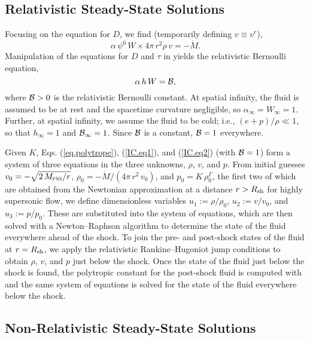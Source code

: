 \subsection{Relativistic Steady-State Solutions}

Focusing on the equation for $D$, we find
(temporarily defining $v\equiv v^{r}$),
\begin{equation}
  \alpha\,\psi^{6}\,W \times 4\pi\,r^{2}\rho\,v=-\dot{M}.
  \label{IC.eq1}
\end{equation}
Manipulation of the equations for $D$ and $\tau$
in  yields the relativistic Bernoulli equation,
\begin{equation}
  \alpha\,h\,W=\mathcal{B},
  \label{IC.eq2}
\end{equation}
where $\mathcal{B}>0$ is the relativistic Bernoulli constant.
At spatial infinity, the fluid is assumed to be at rest and the spacetime
curvature negligible, so $\alpha_{\infty}=W_{\infty}=1$.
Further, at spatial infinity, we assume the fluid to be cold; i.e.,
$\left(e+p\right)/\rho\ll1$,
so that $h_{\infty}=1$ and $\mathcal{B}_{\infty}=1$.
Since $\mathcal{B}$ is a constant, $\mathcal{B}=1$ everywhere.

Given $K$, Eqs. (\ref{eq.polytrope}), (\ref{IC.eq1}),
and (\ref{IC.eq2}) (with $\mathcal{B}=1$)
form a system of three equations in the three unknowns,
$\rho$, $v$, and $p$.
From initial guesses $v_{0}=-\sqrt{2\,M_{\textsc{pns}}/r}$,
$\rho_{0}=-\dot{M}/\left(4\pi\,r^{2}\,v_{0}\right)$, and
$p_{0}=K\,\rho_{0}^{\Gamma}$, the first two of which are obtained
from the Newtonian approximation at a distance $r>R_{\mathrm{sh}}$ for
highly supersonic flow,
we define dimensionless variables
$u_{1}:=\rho/\rho_{0}$, $u_{2}:=v/v_{0}$, and $u_{3}:=p/p_{0}$.
These are substituted into the system of equations, which are then solved
with a Newton--Raphson algorithm to determine the state of the fluid everywhere
ahead of the shock.
To join the pre- and post-shock states of the fluid at $r=R_{\mathrm{sh}}$,
we apply the relativistic Rankine--Hugoniot jump conditions
\citep[i.e., the Taub jump conditions,][]{t1948}
to obtain $\rho$, $v$, and $p$ just below the shock.
Once the state of the fluid just below the shock is found,
the polytropic constant for the post-shock fluid is computed
with 
and the same system of equations is solved for
the state of the fluid everywhere below the shock.

\subsection{Non-Relativistic Steady-State Solutions}

